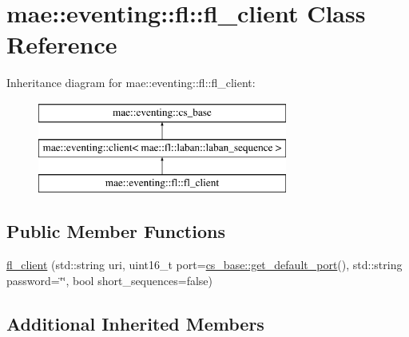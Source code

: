 \hypertarget{classmae_1_1eventing_1_1fl_1_1fl__client}{\section{mae\-:\-:eventing\-:\-:fl\-:\-:fl\-\_\-client Class Reference}
\label{classmae_1_1eventing_1_1fl_1_1fl__client}
}
Inheritance diagram for mae\-:\-:eventing\-:\-:fl\-:\-:fl\-\_\-client\-:\begin{figure}[H]
\begin{center}
\leavevmode
\includegraphics[height=3.000000cm]{classmae_1_1eventing_1_1fl_1_1fl__client}
\end{center}
\end{figure}
\subsection*{Public Member Functions}
\begin{DoxyCompactItemize}
\item 
\hyperlink{classmae_1_1eventing_1_1fl_1_1fl__client_aef8628b94f5cf16e5e5b9159a234c63e}{fl\-\_\-client} (std\-::string uri, uint16\-\_\-t port=\hyperlink{classmae_1_1eventing_1_1cs__base_a5c068f50b548ec7299133976c00fa5a4}{cs\-\_\-base\-::get\-\_\-default\-\_\-port}(), std\-::string password=\char`\"{}\char`\"{}, bool short\-\_\-sequences=false)
\end{DoxyCompactItemize}
\subsection*{Additional Inherited Members}


